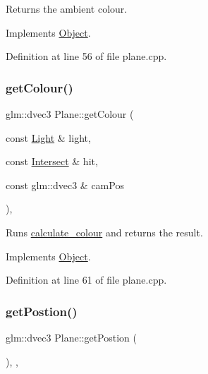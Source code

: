 Returns the ambient colour. 



Implements \mbox{\hyperlink{class_object_a96a5bb5dcad4c340caa1d806fb5bd572}{Object}}.



Definition at line 56 of file plane.\+cpp.

\mbox{\label{class_plane_a05e58028f795833a1ee68b374597fa3a}} 
\subsubsection{\texorpdfstring{get\+Colour()}{getColour()}\hspace{0.1cm}{\footnotesize\ttfamily [2/2]}}
{\footnotesize\ttfamily glm\+::dvec3 Plane\+::get\+Colour (\begin{DoxyParamCaption}\item[{const \mbox{\hyperlink{class_light}{Light}} \&}]{light,  }\item[{const \mbox{\hyperlink{struct_intersect}{Intersect}} \&}]{hit,  }\item[{const glm\+::dvec3 \&}]{cam\+Pos }\end{DoxyParamCaption})\hspace{0.3cm}{\ttfamily [override]}, {\ttfamily [virtual]}}



Runs \mbox{\hyperlink{util_8h_add552e26ff1418c78cbcb09b18ab0f44}{calculate\+\_\+colour}} and returns the result. 



Implements \mbox{\hyperlink{class_object_abecc5668197c7222b5c9180a9738f69b}{Object}}.



Definition at line 61 of file plane.\+cpp.

\mbox{\label{class_plane_ab49db9185e5489809dc13135a5231109}} 
\subsubsection{\texorpdfstring{get\+Postion()}{getPostion()}}
{\footnotesize\ttfamily glm\+::dvec3 Plane\+::get\+Postion (\begin{DoxyParamCaption}{ }\end{DoxyParamCaption})\hspace{0.3cm}{\ttfamily [inline]}, {\ttfamily [override]}, {\ttfamily [virtual]}}



